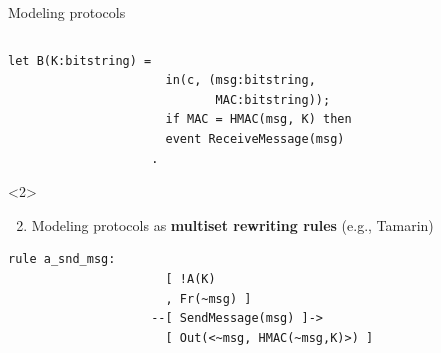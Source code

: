 \documentclass[11pt,aspectratio=169]{beamer}
\begin{document}
\begin{frame}[fragile]{Modeling protocols}
\begin{columns}
\begin{column}{0.5\textwidth}
\begin{onlyenv}
\begin{lstlisting}[style=proverif,gobble=16]
                    let B(K:bitstring) =
                      in(c, (msg:bitstring,
                             MAC:bitstring));
                      if MAC = HMAC(msg, K) then
                      event ReceiveMessage(msg)
                    .
                \end{lstlisting}
            \end{onlyenv}%
            \begin{onlyenv}<2>
                \begin{enumerate}
                    \setcounter{enumi}{1}
                    \item Modeling protocols as
                          \textbf{multiset rewriting rules} (e.g., Tamarin)
                \end{enumerate}
                \vspace*{.5cm}
                \begin{lstlisting}[style=tamarin,gobble=16]
                    rule a_snd_msg:
                      [ !A(K)
                      , Fr(~msg) ]
                    --[ SendMessage(msg) ]->
                      [ Out(<~msg, HMAC(~msg,K)>) ]



\end{lstlisting}
\end{onlyenv}
\end{column}
\end{columns}
\end{frame}
\end{document}
